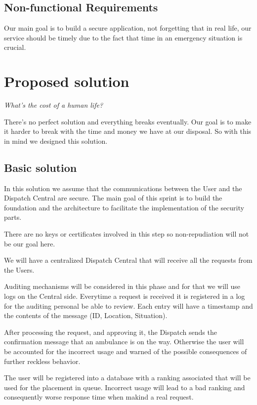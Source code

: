 \documentclass[a4paper,titlepage,11pt]{article}
\begin{document}
\subsection{Non-functional Requirements}
Our main goal is to build a secure application, not forgetting that in real life,
our service should be timely due to the fact that time in an emergency situation is crucial.

\section{Proposed solution}

\begin{center}
  \textit{What's the cost of a human life?}
\end{center}

There's no perfect solution and everything breaks eventually.
Our goal is to make it harder to break with the time and money we have at our disposal.
So with this in mind we designed this solution.

\subsection{Basic solution}
In this solution we assume that the communications between the User and the Dispatch Central are secure.
The main goal of this sprint is to build the foundation and the architecture to facilitate the implementation of the security parts.

There are no keys or certificates involved in this step so non-repudiation will not be our goal here.

We will have a centralized Dispatch Central that will receive all the requests from the Users.

Auditing mechanisms will be considered in this phase and for that we will use logs on the Central side.
Everytime a request is received it is registered in a log for the auditing personal be able to review.
Each entry will have a timestamp and the contents of the message (ID, Location, Situation).

After processing the request, and approving it, the Dispatch sends the confirmation message that an ambulance is on the way.
Otherwise the user will be accounted for the incorrect usage and warned of the possible consequences of further reckless behavior.

The user will be registered into a database with a ranking associated that will be used for the placement in queue.
Incorrect usage will lead to a bad ranking and consequently worse response time when makind a real request.
\end{document}
